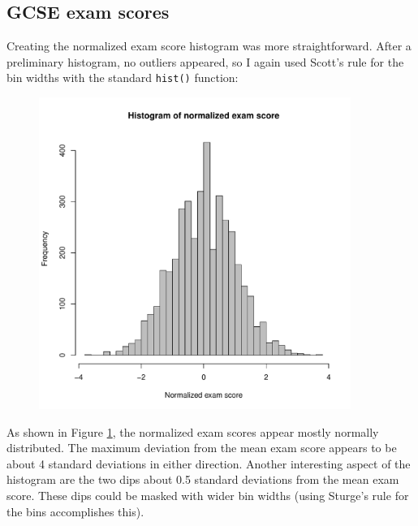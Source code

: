 \documentclass{article}
\begin{document}
\subsection{GCSE exam scores}
Creating the normalized exam score histogram was more straightforward. After a preliminary histogram, no outliers appeared, so I again used Scott's rule for the bin widths with the standard \verb|hist()| function:

\begin{figure}[H]
\centering
\includegraphics[width = 4in]{figures/histogram_2.pdf}
\caption{}
\label{hist2}
\end{figure}

As shown in Figure \ref{hist2}, the normalized exam scores appear mostly normally distributed. The maximum deviation from the mean exam score appears to be about 4 standard deviations in either direction. Another interesting aspect of the histogram are the two dips about 0.5 standard deviations from the mean exam score. These dips could be masked with wider bin widths (using Sturge's rule for the bins accomplishes this).
\end{document}
